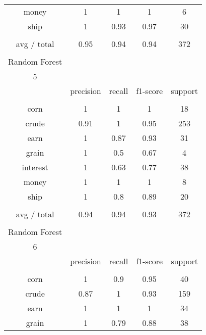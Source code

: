 \documentclass[11pt]{article}
\begin{document}
\begin{center}
\begin{longtable}{| c | c | c | c | c |}
money         & 1         & 1      & 1        & 6       \\
ship          & 1         & 0.93   & 0.97     & 30      \\
             &           &        &          &         \\
avg / total   & 0.95      & 0.94   & 0.94     & 372     \\
             &           &        &          &         \\
Random Forest &           &        &          &         \\
5             &           &        &          &         \\
             & precision & recall & f1-score & support \\
             &           &        &          &         \\
corn          & 1         & 1      & 1        & 18      \\
crude         & 0.91      & 1      & 0.95     & 253     \\
earn          & 1         & 0.87   & 0.93     & 31      \\
grain         & 1         & 0.5    & 0.67     & 4       \\
interest      & 1         & 0.63   & 0.77     & 38      \\
money         & 1         & 1      & 1        & 8       \\
ship          & 1         & 0.8    & 0.89     & 20      \\
             &           &        &          &         \\
avg / total   & 0.94      & 0.94   & 0.93     & 372     \\
             &           &        &          &         \\
Random Forest &           &        &          &         \\
6             &           &        &          &         \\
             & precision & recall & f1-score & support \\
             &           &        &          &         \\
corn          & 1         & 0.9    & 0.95     & 40      \\
crude         & 0.87      & 1      & 0.93     & 159     \\
earn          & 1         & 1      & 1        & 34      \\
grain         & 1         & 0.79   & 0.88     & 38      \\

\end{longtable}
\end{center}
\end{document}
